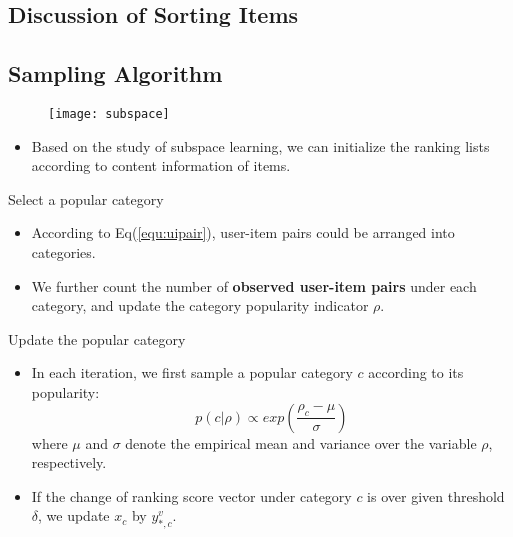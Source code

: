 \subsection*{Discussion of Sorting Items}
\subsection*{Sampling Algorithm}
\begin{frame}

	\begin{figure}
		\texttt{[image: subspace]}
	\end{figure}
	\begin{itemize}
		\item Based on the study of subspace learning, we can initialize the ranking lists according to content information of items.
	\end{itemize}
	 
\end{frame}
\begin{frame}{Select a popular category}
	\begin{itemize}
		\setlength{\itemsep}{1.5em}
		\item According to Eq(\ref{equ:uipair}), user-item pairs could be arranged into categories.
		\item We further count the
		number of \textbf{observed user-item pairs} under each category, and update the category popularity indicator $\rho$.
		
		
	\end{itemize}
	
\end{frame}

\begin{frame}{Update the popular category}
	\begin{itemize}
		\setlength{\itemsep}{1em}
		\item In each iteration, we first sample a popular category $c$ according
		to its popularity:
		\begin{equation}
		p\left(c|\rho \right) \propto exp\left(\frac{\rho_c - \mu }{\sigma}\right)
		\end{equation}
		where $\mu$ and $\sigma$ denote the empirical mean and variance over
		the variable $\rho$, respectively.
		\item If the change of ranking score vector under category $c$ is over given threshold $\delta$, we update   $x_c$ by $y^v_{*,c}$.
	\end{itemize}
\end{frame}




